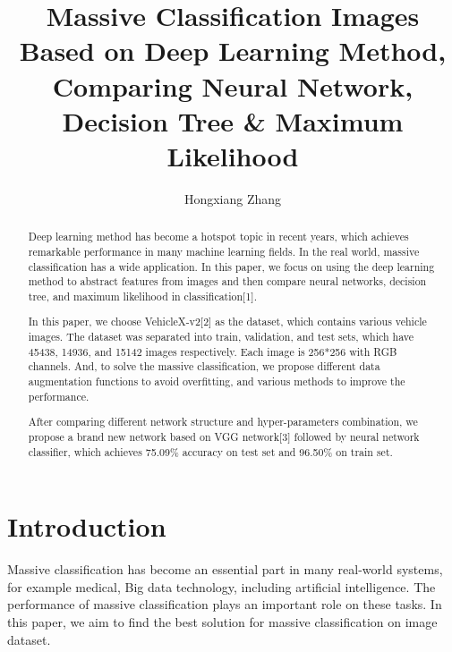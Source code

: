 \documentclass[runningheads]{llncs}
\begin{document}
\title{Massive Classification Images Based on Deep Learning Method, Comparing Neural Network, Decision Tree \& Maximum Likelihood}

\author{Hongxiang Zhang}


%
\maketitle
%
\begin{abstract}
Deep learning method has become a hotspot topic in recent years, which achieves remarkable performance in many machine learning fields. In the real world, massive classification has a wide application. In this paper, we focus on using the deep learning method to abstract features from images and then compare neural networks, decision tree, and maximum likelihood in classification[1].

In this paper, we choose VehicleX-v2[2] as the dataset, which contains various vehicle images. The dataset was separated into train, validation, and test sets, which have 45438, 14936, and 15142 images respectively. Each image is 256*256 with RGB channels. And, to solve the massive classification, we propose different data augmentation functions to avoid overfitting, and various methods to improve the performance.

After comparing different network structure and hyper-parameters combination, we propose a brand new network based on VGG network[3] followed by neural network classifier, which achieves 75.09\% accuracy on test set and 96.50\% on train set.


\end{abstract}

\section{Introduction}

Massive classification has become an essential part in many real-world systems, for example medical, Big data technology, including artificial intelligence. The performance of massive classification plays an important role on these tasks. In this paper, we aim to find the best solution for massive classification on image dataset.
\end{document}
